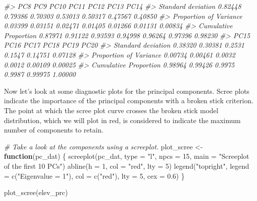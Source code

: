 \documentclass[
]{article}
\newenvironment{Shaded}{\begin{snugshade}}{\end{snugshade}}
\newcommand{\AttributeTok}[1]{\textcolor[rgb]{0.77,0.63,0.00}{#1}}
\newcommand{\CommentTok}[1]{\textcolor[rgb]{0.56,0.35,0.01}{\textit{#1}}}
\newcommand{\ControlFlowTok}[1]{\textcolor[rgb]{0.13,0.29,0.53}{\textbf{#1}}}
\newcommand{\DecValTok}[1]{\textcolor[rgb]{0.00,0.00,0.81}{#1}}
\newcommand{\FloatTok}[1]{\textcolor[rgb]{0.00,0.00,0.81}{#1}}
\newcommand{\FunctionTok}[1]{\textcolor[rgb]{0.00,0.00,0.00}{#1}}
\newcommand{\NormalTok}[1]{#1}
\newcommand{\OtherTok}[1]{\textcolor[rgb]{0.56,0.35,0.01}{#1}}
\newcommand{\StringTok}[1]{\textcolor[rgb]{0.31,0.60,0.02}{#1}}
\begin{document}
\begin{Shaded}
\begin{Highlighting}[]
\CommentTok{\#\textgreater{}                            PC8     PC9    PC10    PC11    PC12    PC13    PC14}
\CommentTok{\#\textgreater{} Standard deviation     0.82448 0.79386 0.70303 0.53013 0.50317 0.47567 0.40850}
\CommentTok{\#\textgreater{} Proportion of Variance 0.03399 0.03151 0.02471 0.01405 0.01266 0.01131 0.00834}
\CommentTok{\#\textgreater{} Cumulative Proportion  0.87971 0.91122 0.93593 0.94998 0.96264 0.97396 0.98230}
\CommentTok{\#\textgreater{}                           PC15    PC16   PC17   PC18    PC19    PC20}
\CommentTok{\#\textgreater{} Standard deviation     0.38320 0.30381 0.2531 0.1547 0.14751 0.07128}
\CommentTok{\#\textgreater{} Proportion of Variance 0.00734 0.00461 0.0032 0.0012 0.00109 0.00025}
\CommentTok{\#\textgreater{} Cumulative Proportion  0.98964 0.99426 0.9975 0.9987 0.99975 1.00000}
\end{Highlighting}
\end{Shaded}

Now let's look at some diagnostic plots for the principal components.
Scree plots indicate the importance of the principal components with a
broken stick criterion. The point at which the scree plot curve crosses
the broken stick model distribution, which we will plot in red, is
considered to indicate the maximum number of components to retain.

\begin{Shaded}
\begin{Highlighting}[]
\CommentTok{\# Take a look at the components using a screeplot.}
\NormalTok{plot\_scree }\OtherTok{\textless{}{-}} \ControlFlowTok{function}\NormalTok{(pc\_dat) \{}
  \FunctionTok{screeplot}\NormalTok{(pc\_dat, }\AttributeTok{type =} \StringTok{"l"}\NormalTok{, }\AttributeTok{npcs =} \DecValTok{15}\NormalTok{, }
            \AttributeTok{main =} \StringTok{"Screeplot of the first 10 PCs"}\NormalTok{)}
  \FunctionTok{abline}\NormalTok{(}\AttributeTok{h =} \DecValTok{1}\NormalTok{, }\AttributeTok{col =} \StringTok{"red"}\NormalTok{, }\AttributeTok{lty =} \DecValTok{5}\NormalTok{)}
  \FunctionTok{legend}\NormalTok{(}\StringTok{"topright"}\NormalTok{, }\AttributeTok{legend =} \FunctionTok{c}\NormalTok{(}\StringTok{"Eigenvalue = 1"}\NormalTok{),}
         \AttributeTok{col =} \FunctionTok{c}\NormalTok{(}\StringTok{"red"}\NormalTok{), }\AttributeTok{lty =} \DecValTok{5}\NormalTok{, }\AttributeTok{cex =} \FloatTok{0.6}\NormalTok{)}
\NormalTok{\}}

\FunctionTok{plot\_scree}\NormalTok{(elev\_prc)}
\end{Highlighting}
\end{Shaded}
\end{document}
